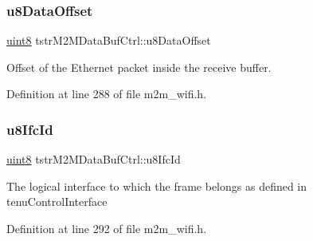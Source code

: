 \mbox{\label{group__WifiSetCustInfoElementFn_ga64696606fffd6f5dc92e09f4906a820b}} 
\subsubsection{\texorpdfstring{u8\+Data\+Offset}{u8DataOffset}}
{\footnotesize\ttfamily \hyperlink{group__DataT_ga4df709a77647e870bbf1d955b8edc9a6}{uint8} tstr\+M2\+M\+Data\+Buf\+Ctrl\+::u8\+Data\+Offset}

Offset of the Ethernet packet inside the receive buffer. 

Definition at line 288 of file m2m\+\_\+wifi.\+h.

\mbox{\label{group__WifiSetCustInfoElementFn_ga241fb3cd2305fec01b46ef9f19180806}} 
\subsubsection{\texorpdfstring{u8\+Ifc\+Id}{u8IfcId}}
{\footnotesize\ttfamily \hyperlink{group__DataT_ga4df709a77647e870bbf1d955b8edc9a6}{uint8} tstr\+M2\+M\+Data\+Buf\+Ctrl\+::u8\+Ifc\+Id}

The logical interface to which the frame belongs as defined in tenu\+Control\+Interface 

Definition at line 292 of file m2m\+\_\+wifi.\+h.

